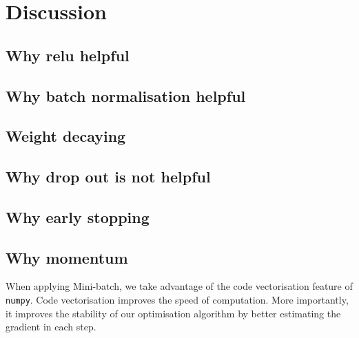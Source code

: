 \section{Discussion}
\subsection{Why relu helpful}
\subsection{Why batch normalisation helpful}
\subsection{Weight decaying}
\subsection{Why drop out is not helpful}
\subsection{Why early stopping}
\subsection{Why momentum}


When applying Mini-batch, we take advantage of the code vectorisation feature of \texttt{numpy}. Code vectorisation improves the speed of computation. More importantly, it improves the stability of our optimisation algorithm by better estimating the gradient in each step.
